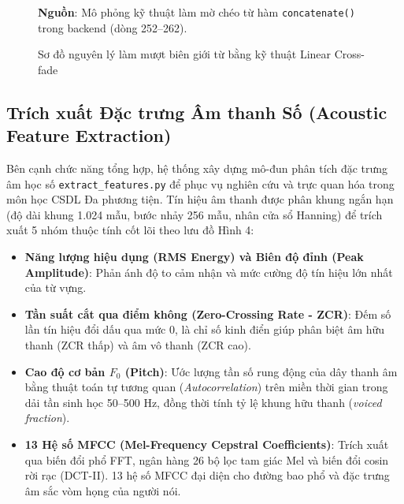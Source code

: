 \begin{figure}[H]
\caption{Sơ đồ nguyên lý làm mượt biên giới từ bằng kỹ thuật Linear Cross-fade}
\label{fig:crossfade_diagram}
\par\vspace{4pt}
\begin{minipage}{0.92\textwidth}
\centering\fontsize{12}{14}\selectfont
\textbf{Nguồn}: Mô phỏng kỹ thuật làm mờ chéo từ hàm \texttt{concatenate()} trong backend (dòng 252--262).
\end{minipage}
\end{figure}

\subsection{Trích xuất Đặc trưng Âm thanh Số (Acoustic Feature Extraction)}

Bên cạnh chức năng tổng hợp, hệ thống xây dựng mô-đun phân tích đặc trưng âm học số \texttt{extract\_features.py} để phục vụ nghiên cứu và trực quan hóa trong môn học CSDL Đa phương tiện. Tín hiệu âm thanh được phân khung ngắn hạn (độ dài khung 1.024 mẫu, bước nhảy 256 mẫu, nhân cửa sổ Hanning) để trích xuất 5 nhóm thuộc tính cốt lõi theo lưu đồ Hình 4:
\begin{itemize}
    \item \textbf{Năng lượng hiệu dụng (RMS Energy) và Biên độ đỉnh (Peak Amplitude)}: Phản ánh độ to cảm nhận và mức cường độ tín hiệu lớn nhất của từ vựng.
    \item \textbf{Tần suất cắt qua điểm không (Zero-Crossing Rate - ZCR)}: Đếm số lần tín hiệu đổi dấu qua mức 0, là chỉ số kinh điển giúp phân biệt âm hữu thanh (ZCR thấp) và âm vô thanh (ZCR cao).
    \item \textbf{Cao độ cơ bản $F_0$ (Pitch)}: Ước lượng tần số rung động của dây thanh âm bằng thuật toán tự tương quan (\textit{Autocorrelation}) trên miền thời gian trong dải tần sinh học 50--500 Hz, đồng thời tính tỷ lệ khung hữu thanh (\textit{voiced fraction}).
    \item \textbf{13 Hệ số MFCC (Mel-Frequency Cepstral Coefficients)}: Trích xuất qua biến đổi phổ FFT, ngân hàng 26 bộ lọc tam giác Mel và biến đổi cosin rời rạc (DCT-II). 13 hệ số MFCC đại diện cho đường bao phổ và đặc trưng âm sắc vòm họng của người nói.
\end{itemize}

